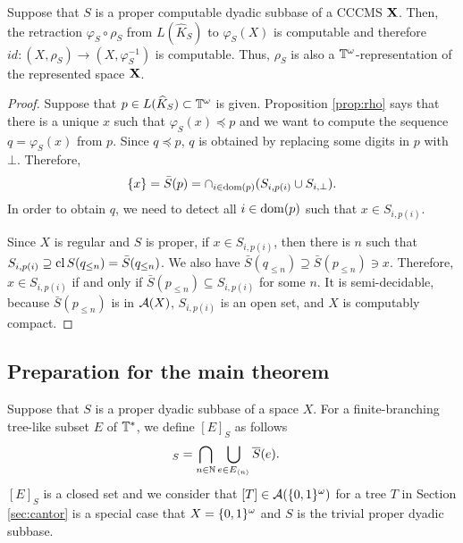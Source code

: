 \documentclass{eptcs-modified}
\begin{document}
\begin{proposition}\label{prop:computable-retract}
  Suppose that $S$ is a proper computable dyadic subbase of a CCCMS $\mathbf{X}$.
  Then, the retraction $\varphi_S \circ \rho_S$ from $L(\widehat{K}_{S})$ to $\varphi_S(X)$ is  computable and therefore
$id: (X, \rho_S) \to (X, \varphi_S^{-1})$ is computable.
Thus,  $\rho_S$ is also a $\mathbb{T}^\omega$-representation of the represented space $\mathbf{X}$.

\end{proposition}
\begin{proof}
Suppose that $p \in L(\widehat{K}_{S}) \subset \mathbb{T}^\omega$ is given.
  Proposition \ref{prop:rho} says that there is a unique $x$ such that $\varphi_S(x) \preceq p$
  and we want to compute the sequence   $q = \varphi_S(x)$ from $p$.
  Since $q \preceq p$,
  $q$ is obtained by replacing some digits in $p$ with $\bot$.
  Therefore,
  $$\{x\} = \bar{S}(p) = \cap_{i\in \operatorname{dom}(p)}  (S_{i,p(i)}\cup S_{i,\bot}).$$
  In order to obtain $q$, we need to detect all $i \in \operatorname{dom}(p)$ such that $x \in S_{i,p(i)}$.

  Since $X$ is regular and $S$ is proper,  if $x \in S_{i, p(i)}$, then
there is $n$ such that
  $S_{i, p(i)} \supseteq
\textrm{cl}\, S(q_{\leq n}) = \bar{S}(q_{\leq n})$.
  We also have $\bar{S}(q_{\leq n}) \supseteq\bar{S}(p_{\leq n}) \ni x$.
  Therefore,  $x \in S_{i,p(i)}$ if and only if $\bar{S}(p_{\leq n}) \subseteq S_{i,p(i)}$ for some $n$.
  It is semi-decidable, because $\bar{S}(p_{\leq n})$ is in $\mathcal{A}(X)$, $S_{i,p(i)}$ is an open set, and
  $X$ is computably compact.
\end{proof}


\subsection{Preparation for the main theorem}

Suppose that  $S$ is a proper dyadic subbase of a space $X$.
For a finite-branching tree-like subset $E$ of $\mathbb{T}^*$, we define
$[E]_S$ as follows
\begin{align*}
[E]_S &= \bigcap_{n \in \mathbb{N}} \bigcup_{e \in \bo{E}{n} } \overline{S}(e).\label{eq:es2}
\end{align*}$[E]_S$ is a closed set and we consider that $[T] \in \mathcal{A}({\{0,1\}^\omega})$ for a tree $T$
in Section \ref{sec:cantor} is a special case that $X = {\{0,1\}^\omega}$ and $S$ is the trivial proper dyadic subbase.
\end{document}
